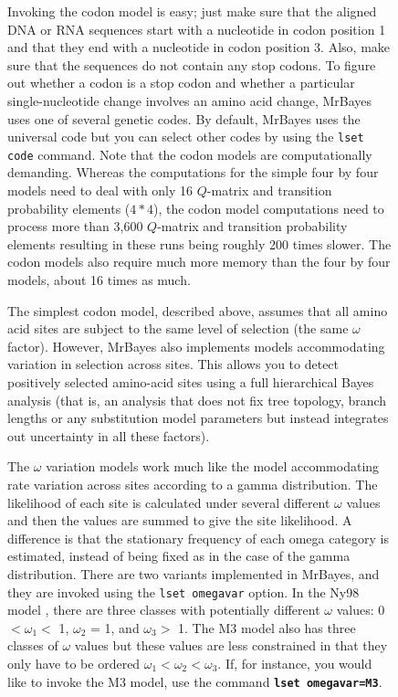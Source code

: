 \documentclass[12pt]{book}
\newcommand{\ttt}[1]{\texttt{#1}}
\newcommand{\tb}[1]{\ttt{\textbf{#1}}}
\begin{document}
\begin{figure}[h]
Invoking the codon model is easy; just make sure that the aligned DNA or RNA sequences start with a
nucleotide in codon position 1 and that they end with a nucleotide in codon position 3. Also, make
sure that the sequences do not contain any stop codons. To figure out whether a codon is a stop
codon and whether a particular single-nucleotide change involves an amino acid change, MrBayes uses
one of several genetic codes. By default, MrBayes uses the universal code but you can select other
codes by using the \ttt{lset code} command. Note that the codon models are computationally
demanding. Whereas the computations for the simple four by four models need to deal with only 16
$Q$-matrix and transition probability elements ($4*4$), the codon model computations need to
process more than 3,600 $Q$-matrix and transition probability elements resulting in these runs
being roughly 200 times slower. The codon models also require much more memory than the four by
four models, about 16 times as much.

The simplest codon model, described above, assumes that all amino acid sites are subject to the
same level of selection (the same $\omega$ factor). However, MrBayes also implements models
accommodating variation in selection across sites. This allows you to detect positively selected
amino-acid sites using a full hierarchical Bayes analysis (that is, an analysis that does not fix
tree topology, branch lengths or any substitution model parameters but instead integrates out
uncertainty in all these factors).

The $\omega$ variation models work much like the model accommodating rate variation across sites
according to a gamma distribution. The likelihood of each site is calculated under several
different $\omega$ values and then the values are summed to give the site likelihood. A difference
is that the stationary frequency of each omega category is estimated, instead of being fixed as in
the case of the gamma distribution. There are two variants implemented in MrBayes, and they are
invoked using the \ttt{lset omegavar} option. In the Ny98 model \citep{nielsen98}, there are three
classes with potentially different $\omega$ values: 0 $< \omega_1 <$ 1, $\omega_2$ = 1, and
$\omega_3 >$ 1. The M3 model also has three classes of $\omega$ values but these values are less
constrained in that they only have to be ordered $\omega_1 < \omega_2 < \omega_3$. If, for
instance, you would like to invoke the M3 model, use the command \tb{lset omegavar=M3}.


\end{figure}
\end{document}
